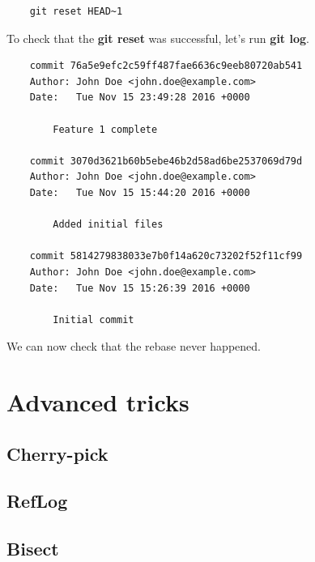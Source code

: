 \documentclass{article}
\begin{document}
\begin{lstlisting}
	git reset HEAD~1
\end{lstlisting}

To check that the \textbf{git reset} was successful, let's run \textbf{git log}.

\begin{lstlisting}
	commit 76a5e9efc2c59ff487fae6636c9eeb80720ab541
	Author: John Doe <john.doe@example.com>
	Date:   Tue Nov 15 23:49:28 2016 +0000

    	Feature 1 complete

	commit 3070d3621b60b5ebe46b2d58ad6be2537069d79d
	Author: John Doe <john.doe@example.com>
	Date:   Tue Nov 15 15:44:20 2016 +0000

    	Added initial files

	commit 5814279838033e7b0f14a620c73202f52f11cf99
	Author: John Doe <john.doe@example.com>
	Date:   Tue Nov 15 15:26:39 2016 +0000

    	Initial commit
\end{lstlisting}

We can now check that the rebase never happened.

\section{Advanced tricks}

\subsection{Cherry-pick}

\subsection{RefLog}

\subsection{Bisect}

\subsection{}
\end{document}
